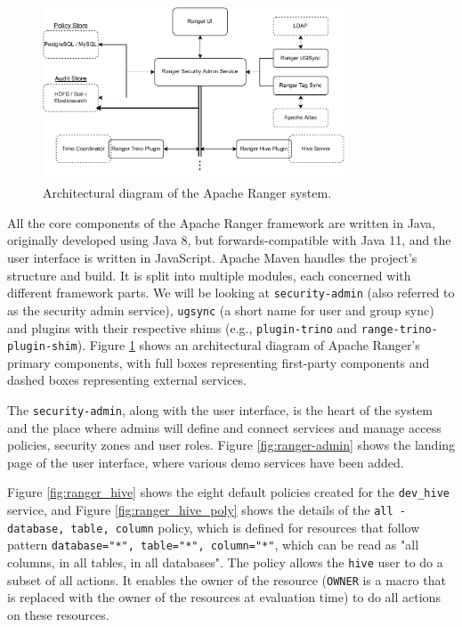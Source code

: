 \begin{figure}
    \centering
    \includegraphics[width=0.8\textwidth]{chapters/tech_background/figures/ranger-arch.pdf}
    \caption{Architectural diagram of the Apache Ranger system.}
    \label{fig:rager_arch}
\end{figure}

All the core components of the Apache Ranger framework are written in Java, originally developed using Java 8, but forwards-compatible with Java 11, and the user interface is written in JavaScript. Apache Maven \cite{apacheMavenTech} handles the project's structure and build. It is split into multiple modules, each concerned with different framework parts. We will be looking at \texttt{security-admin} (also referred to as the security admin service), \texttt{ugsync} (a short name for user and group sync) and plugins with their respective shims (e.g., \texttt{plugin-trino} and \texttt{range-trino-plugin-shim}). Figure \ref{fig:rager_arch} shows an architectural diagram of Apache Ranger's primary components, with full boxes representing first-party components and dashed boxes representing external services.

The \texttt{security-admin}, along with the user interface, is the heart of the system and the place where admins will define and connect services and manage access policies, security zones and user roles. Figure \ref{fig:ranger-admin} shows the landing page of the user interface, where various demo services have been added.

Figure \ref{fig:ranger_hive} shows the eight default policies created for the \texttt{dev_hive} service, and Figure \ref{fig:ranger_hive_poly} shows the details of the \texttt{all - database, table, column} policy, which is defined for resources that follow pattern \texttt{{database="*", table="*", column="*"}}, which can be read as "all columns, in all tables, in all databases". The policy allows the \texttt{hive} user to do a subset of all actions. It enables the owner of the resource (\texttt{{OWNER}} is a macro that is replaced with the owner of the resources at evaluation time) to do all actions on these resources.

